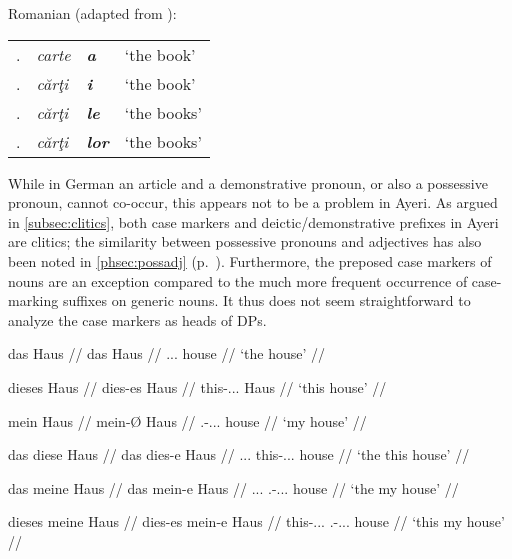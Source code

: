 \a\label{ex:romdecl}%
Romanian (adapted from \cite[75]{lyons1999}):\medskip\\ %
\begin{tabular}[t]{@{} l >{\itshape}l @{} >{\itshape\bfseries}l l}
\Pri{}.\Sg{}
	& carte & a
	& `the book'
	\\

\Obl{}.\Sg{}
	& cărţi & i
	& `the book'
	\\

\Pri{}.\Pl{}
	& cărţi & le
	& `the books'
	\\

\Obl{}.\Pl{}
	& cărţi & lor
	& `the books'
	\\
\end{tabular}
\xe

While in German an article and a demonstrative pronoun, or also a possessive
pronoun, cannot co-occur, this appears not to be a problem in Ayeri. As argued
in \autoref{subsec:clitics}, both case markers and deictic/demonstrative
prefixes in Ayeri are clitics; the similarity between possessive pronouns and
adjectives has also been noted in \autoref{phsec:possadj}
(p.~\pageref{phsec:possadj}). Furthermore, the preposed case markers of nouns
are an exception compared to the much more frequent occurrence of case-marking
suffixes on generic nouns. It thus does not seem straightforward to analyze the
case markers as heads of DPs.

\pex\label{ex:germandetdist}
	\a{}
	\begingl
		\gla das Haus //
		\glb das Haus //
		\glc \Def{}.\Nom{}.\Sg{}.\N{} house //
		\glft `the house' //
	\endgl

	\a\begingl
		\gla dieses Haus //
		\glb dies-es Haus //
		\glc this-\Nom{}.\Sg{}.\N{}.\St{} Haus //
		\glft `this house' //
	\endgl

	\a\begingl
		\gla mein Haus //
		\glb mein-Ø Haus //
		\glc \Fsg{}.\Gen{}-\Nom{}.\Sg{}.\N{}.\St{} house //
		\glft `my house' //
	\endgl

	\a\ljudge*\begingl
		\gla das diese Haus //
		\glb das dies-e Haus //
		\glc \Def{}.\Nom{}.\Sg{}.\N{} this-\Nom{}.\Sg{}.\N{}.\Wk{} house //
		\glft `the this house' //
	\endgl

	\a\ljudge*\begingl
		\gla das meine Haus //
		\glb das mein-e Haus //
		\glc \Def{}.\Nom{}.\Sg{}.\N{} \Fsg{}.\Gen{}-\Nom{}.\Sg{}.\N{}.\Wk{} 
			house //
		\glft `the my house' //
	\endgl

	\a\ljudge*\label{ex:germandemposswk}\begingl
		\gla dieses meine Haus //
		\glb dies-es mein-e Haus //
		\glc this-\Nom{}.\Sg{}.\N{}.\St{} 
			\Fsg{}.\Gen{}-\Nom{}.\Sg{}.\N{}.\Wk{} house //
		\glft `this my house' //
	\endgl

